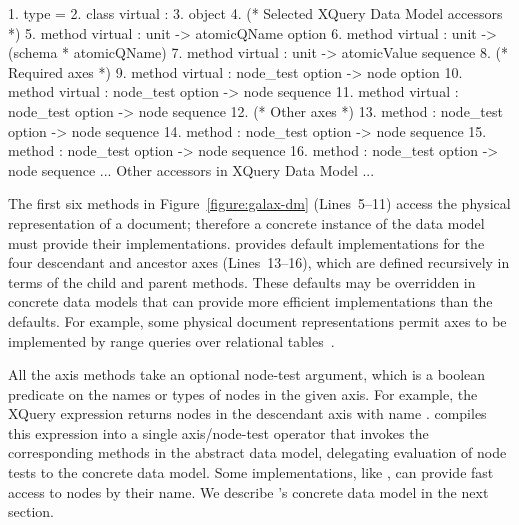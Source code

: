 \begin{figure*}
\begin{small}
\begin{code}
{ 1}. type  = 
{ 2}. class virtual  : 
{ 3}. object
{ 4}.   (* Selected XQuery Data Model accessors *)
{ 5}.   method virtual    : unit -> atomicQName option
{ 6}.   method virtual         : unit -> (schema * atomicQName)
{ 7}.   method virtual  : unit -> atomicValue sequence
\mbox{}
{ 8}.   (* Required axes *)
{ 9}.   method virtual       : node_test option -> node option
{10}.   method virtual        : node_test option -> node sequence
{11}.   method virtual    : node_test option -> node sequence
\mbox{}
{12}.   (* Other axes *)
{13}.   method   : node_test option -> node sequence
{14}.   method           : node_test option -> node sequence
{15}.   method     : node_test option -> node sequence
{16}.   method             : node_test option -> node sequence
\mbox{}
  ... Other accessors in XQuery Data Model ...
\end{code}
\end{small}
\caption{Signatures for methods in Galax's abstract node interface}
\label{figure:galax-dm}
\end{figure*}

The first six methods in Figure~\ref{figure:galax-dm} (Lines~5--11) access the
physical representation of a document; therefore a concrete instance
of the data model must provide their implementations.  \Galax{}
provides default implementations for the four {descendant} and
ancestor axes (Lines~13--16), which are defined recursively in terms of the {child}
and {parent} methods.  These defaults may be overridden in concrete data
models that can provide more efficient implementations than the
defaults.  For example, some physical document representations permit
axes to be implemented by range queries over relational
tables~\cite{grust03staircase}.

All the axis methods take an optional node-test argument, which is a
boolean predicate on the names or types of nodes in the given axis.
For example, the XQuery expression  returns
nodes in the descendant axis with name .  \Galax{} compiles
this expression into a single axis/node-test operator that invokes the
corresponding methods in the abstract data model, delegating
evaluation of node tests to the concrete data model.  Some
implementations, like \padx{}, can provide fast access to nodes by
their name.  We describe \padx{}'s concrete data model in the next
section.


